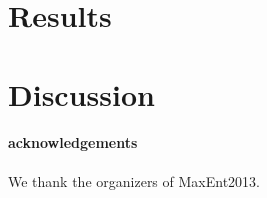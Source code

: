 \documentclass[12pt]{emulateapj}
\newcommand{\project}[1]{\textsl{#1}}
\newcommand{\given}{\,|\,}
\newcommand{\Uniform}{{\mathcal U}}
\newcommand{\bg}{\mathrm{bg}}
\begin{document}

  






\section{Results}



\section{Discussion}


\paragraph{acknowledgements}
We thank the organizers of MaxEnt2013.
\end{document}

